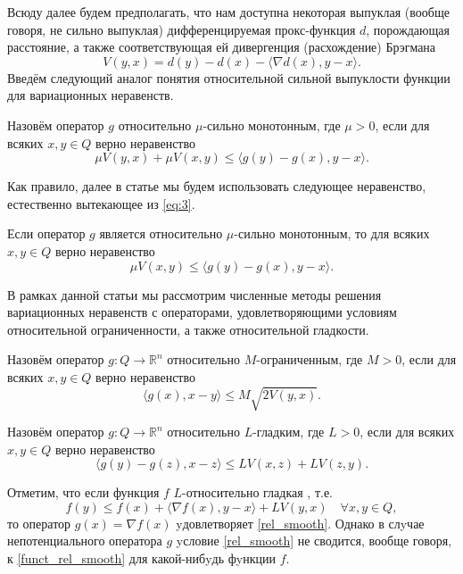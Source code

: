     Всюду далее будем предполагать, что нам доступна некоторая выпуклая (вообще говоря, не сильно выпуклая) дифференцируемая прокс-функция $d$, порождающая расстояние, а также соответствующая ей дивергенция (расхождение) Брэгмана \cite{Bauschke}
    $$
        V(y, x) = d(y) - d(x) - \langle \nabla d(x), y - x \rangle.
    $$
    Введём следующий аналог понятия относительной сильной выпуклости функции \cite{Lu_Nesterov_2018} для вариационных неравенств.
    \begin{definition}\label{DefRelStrongMonot}
        Назовём оператор $g$ относительно $\mu$-сильно монотонным, где $\mu >0$, если для всяких $x, y \in Q$ верно неравенство
        \begin{equation}\label{eq:3}
             \mu V(y, x) + \mu V(x, y) \leq \langle g(y) - g(x), y - x \rangle.
         \end{equation}
    \end{definition}
    Как правило, далее в статье мы будем использовать следующее неравенство, естественно вытекающее из \eqref{eq:3}.
    \begin{remark}
        Если оператор $g$ является  относительно $\mu$-сильно монотонным, то для всяких $x, y \in Q$ верно неравенство
        \begin{equation}\label{cr:4}
             \mu V(x, y) \leq \langle g(y) - g(x), y - x \rangle.
         \end{equation}
    \end{remark}
    В рамках данной статьи мы рассмотрим численные методы решения вариационных неравенств с операторами, удовлетворяющими условиям относительной ограниченности, а также относительной гладкости.
    \begin{definition}\label{DefRelBound}\cite{Main}
        Назовём оператор $g: Q \longrightarrow \mathbb{R}^n$ относительно $M$-огранич\-енным, где $M >0$, если для всяких $x, y \in Q$ верно неравенство
        \begin{equation}\label{rel_bound}
             \langle g(x), x - y \rangle \leq M\sqrt{2V(y,x)}.
         \end{equation}
    \end{definition}
    \begin{definition}\cite{Inex}
        Назовём оператор $g: Q \longrightarrow \mathbb{R}^n$ относительно $L$-гладким, где $L > 0$, если для всяких $x, y \in Q$ верно неравенство
        \begin{equation}\label{rel_smooth}
            \langle g(y)-g(z),x-z\rangle \leq LV(x,z) + LV(z,y).
        \end{equation}
    \end{definition}
    Отметим, что если функция $f$ $L$-относительно гладкая \cite{Bauschke}, т.е.
    \begin{equation}\label{funct_rel_smooth}
        f(y) \leq f(x) + \langle \nabla f(x), y - x\rangle + LV(y, x) \quad \forall x, y \in Q,
    \end{equation}
    то оператор $g(x) = \nabla f(x)$ yдовлетворяет \eqref{rel_smooth}. Однако в слyчае непотенциального оператора $g$ yсловие \eqref{rel_smooth} не сводится, вообще говоря, к \eqref{funct_rel_smooth} для какой-нибyдь фyнкции $f$.


